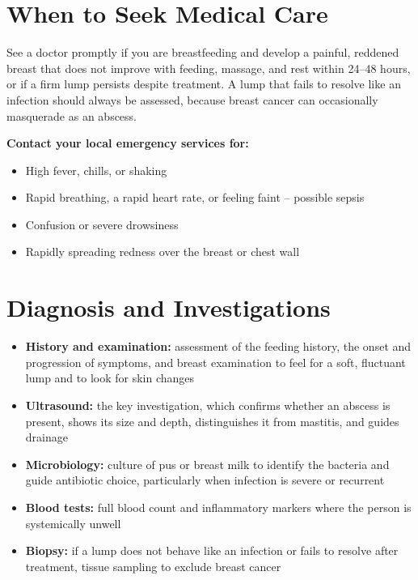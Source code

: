 \section*{When to Seek Medical Care}
See a doctor promptly if you are breastfeeding and develop a painful, reddened breast that does not improve with feeding, massage, and rest within 24--48 hours, or if a firm lump persists despite treatment. A lump that fails to resolve like an infection should always be assessed, because breast cancer can occasionally masquerade as an abscess.

\textbf{Contact your local emergency services for:}
\begin{itemize}
    \item High fever, chills, or shaking
    \item Rapid breathing, a rapid heart rate, or feeling faint -- possible sepsis
    \item Confusion or severe drowsiness
    \item Rapidly spreading redness over the breast or chest wall
\end{itemize}

\section*{Diagnosis and Investigations}
\begin{itemize}
    \item \textbf{History and examination:} assessment of the feeding history, the onset and progression of symptoms, and breast examination to feel for a soft, fluctuant lump and to look for skin changes
    \item \textbf{Ultrasound:} the key investigation, which confirms whether an abscess is present, shows its size and depth, distinguishes it from mastitis, and guides drainage
    \item \textbf{Microbiology:} culture of pus or breast milk to identify the bacteria and guide antibiotic choice, particularly when infection is severe or recurrent
    \item \textbf{Blood tests:} full blood count and inflammatory markers where the person is systemically unwell
    \item \textbf{Biopsy:} if a lump does not behave like an infection or fails to resolve after treatment, tissue sampling to exclude breast cancer
\end{itemize}

